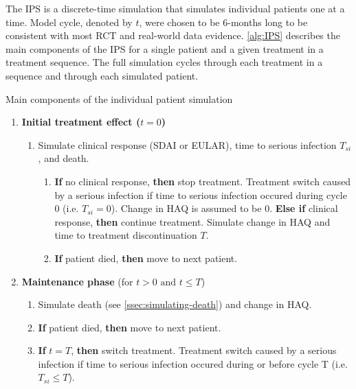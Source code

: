 \documentclass[11pt,final,fleqn]{article}\usepackage[]{graphicx}\usepackage[]{color}
\theoremstyle{plain}
\begin{document}
The IPS is a discrete-time simulation that simulates individual patients one at a time. Model cycle, denoted by $t$, were chosen to be 6-months long to be consistent with most RCT and real-world data evidence. \autoref{alg:IPS} describes the main components of the IPS for a single patient and a given treatment in a treatment sequence. The full simulation cycles through each treatment in a sequence and through each simulated patient.

\begin{algorithm}
\caption{Main components of the individual patient simulation}
\label{alg:IPS}
\begin{enumerate}
\item \textbf{Initial treatment effect ($t = 0$)}
\begin{enumerate}
\item Simulate clinical response (SDAI or EULAR), time to serious infection $T_{si}$, and death.
\begin{enumerate}
\item \textbf{If} no clinical response, \textbf{then} stop treatment. Treatment switch caused by a serious infection if time to serious infection occured during cycle 0 (i.e. $T_{si} = 0$). Change in HAQ is assumed to be $0$. 
\newline \textbf{Else if} clinical response, \textbf{then} continue treatment. Simulate change in HAQ and time to treatment discontinuation $T$.
\item \textbf{If} patient died, \textbf{then} move to next patient. 
\end{enumerate}
\end{enumerate}
\item \textbf{Maintenance phase} (for $t > 0 \text{ and } t \leq T$)
\begin{enumerate}
\item Simulate death (see \autoref{ssec:simulating-death}) and change in HAQ.
\item \textbf{If} patient died, \textbf{then} move to next patient.
\item \textbf{If} $t = T$, \textbf{then} switch treatment. Treatment switch caused by a serious infection if time to serious infection occured during or before cycle T (i.e. $T_{si} \leq T$). 
\end{enumerate}
\end{enumerate}
\end{algorithm}
\end{document}
